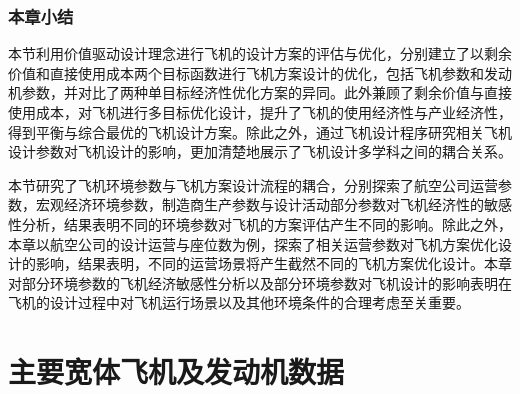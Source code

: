 \documentclass[12pt,a4paper]{report}
\begin{document}
\subsection{本章小结}

本节利用价值驱动设计理念进行飞机的设计方案的评估与优化，分别建立了以剩余价值和直接使用成本两个目标函数进行飞机方案设计的优化，包括飞机参数和发动机参数，并对比了两种单目标经济性优化方案的异同。此外兼顾了剩余价值与直接使用成本，对飞机进行多目标优化设计，提升了飞机的使用经济性与产业经济性，得到平衡与综合最优的飞机设计方案。除此之外，通过飞机设计程序研究相关飞机设计参数对飞机设计的影响，更加清楚地展示了飞机设计多学科之间的耦合关系。

本节研究了飞机环境参数与飞机方案设计流程的耦合，分别探索了航空公司运营参数，宏观经济环境参数，制造商生产参数与设计活动部分参数对飞机经济性的敏感性分析，结果表明不同的环境参数对飞机的方案评估产生不同的影响。除此之外，本章以航空公司的设计运营与座位数为例，探索了相关运营参数对飞机方案优化设计的影响，结果表明，不同的运营场景将产生截然不同的飞机方案优化设计。本章对部分环境参数的飞机经济敏感性分析以及部分环境参数对飞机设计的影响表明在飞机的设计过程中对飞机运行场景以及其他环境条件的合理考虑至关重要。


\chapter{主要宽体飞机及发动机数据}
\end{document}
